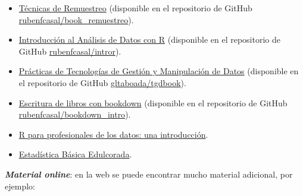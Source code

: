 \documentclass[
]{book}
\theoremstyle{break}
\theoremstyle{definition}
\theoremstyle{definition}
\theoremstyle{definition}
\theoremstyle{remark}
\begin{document}
\begin{itemize}
  \begin{itemize}
  \item
    \href{https://rubenfcasal.github.io/book_remuestreo}{Técnicas de Remuestreo}
    (disponible en el repositorio de GitHub
    \href{https://github.com/rubenfcasal/book_remuestreo}{rubenfcasal/book\_remuestreo}).
  \item
    \href{https://rubenfcasal.github.io/intror}{Introducción al Análisis de Datos con R}
    (disponible en el repositorio de GitHub
    \href{https://github.com/rubenfcasal/intror}{rubenfcasal/intror}).
  \item
    \href{https://gltaboada.github.io/tgdbook}{Prácticas de Tecnologías de Gestión y Manipulación de Datos}
    (disponible en el repositorio de GitHub
    \href{https://github.com/gltaboada/tgdbook}{gltaboada/tgdbook}).
  \item
    \href{https://rubenfcasal.github.io/bookdown_intro/}{Escritura de libros con bookdown}
    (disponible en el repositorio de GitHub
    \href{https://github.com/rubenfcasal/bookdown_intro}{rubenfcasal/bookdown\_intro}).
  \item
    \href{https://www.datanalytics.com/libro_r/index.html}{R para profesionales de los datos: una introducción}.
  \item
    \href{https://bookdown.org/aquintela/EBE}{Estadística Básica Edulcorada}.
  \end{itemize}
\end{itemize}

\textbf{\emph{Material online}}:
en la web se puede encontrar mucho material adicional, por ejemplo:
\end{document}
